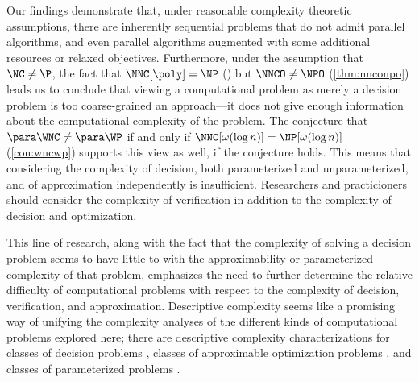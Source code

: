 %
%
%
Our findings demonstrate that, under reasonable complexity theoretic assumptions, there are inherently sequential problems that do not admit parallel algorithms, and even parallel algorithms augmented with some additional resources or relaxed objectives.
Furthermore, under the assumption that $\NC \neq \P$, the fact that $\NNC[\poly] = \NP$ (\autocite{wolf94}) but $\NNCO \neq \NPO$ (\autoref{thm:nnconpo}) leads us to conclude that viewing a computational problem as merely a decision problem is too coarse-grained an approach---it does not give enough information about the computational complexity of the problem.
The conjecture that $\para \WNC \neq \para \WP$ if and only if $\NNC[\omega(\log n)] = \NP[\omega(\log n)]$ (\autoref{con:wncwp}) supports this view as well, if the conjecture holds.
This means that considering the complexity of decision, both parameterized and unparameterized, and of approximation independently is insufficient.
Researchers and practicioners should consider the complexity of verification in addition to the complexity of decision and optimization.

%
%
This line of research, along with the fact that the complexity of solving a decision problem seems to have little to with the approximability or parameterized complexity of that problem, emphasizes the need to further determine the relative difficulty of computational problems with respect to the complexity of decision, verification, and approximation.
Descriptive complexity seems like a promising way of unifying the complexity analyses of the different kinds of computational problems explored here; there are descriptive complexity characterizations for classes of decision problems \autocite{immerman99}, classes of approximable optimization problems \autocite{kt93}, and classes of parameterized problems \autocite{fg06}.
